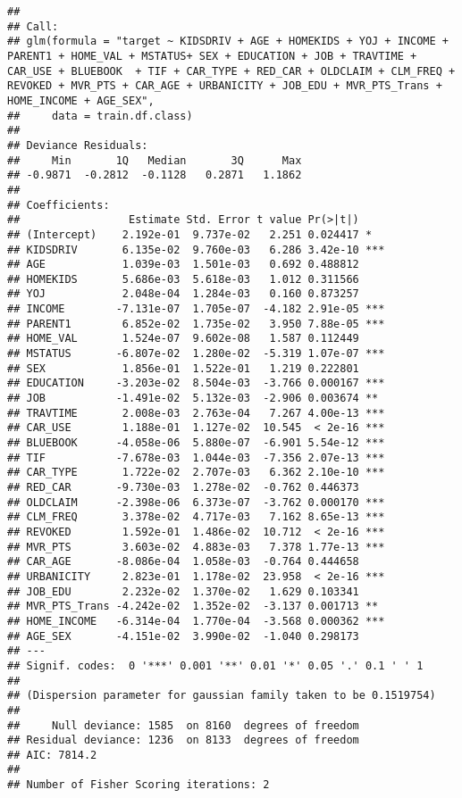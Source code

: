 \documentclass[]{article}
\begin{document}
\begin{verbatim}
## 
## Call:
## glm(formula = "target ~ KIDSDRIV + AGE + HOMEKIDS + YOJ + INCOME + PARENT1 + HOME_VAL + MSTATUS+ SEX + EDUCATION + JOB + TRAVTIME + CAR_USE + BLUEBOOK  + TIF + CAR_TYPE + RED_CAR + OLDCLAIM + CLM_FREQ + REVOKED + MVR_PTS + CAR_AGE + URBANICITY + JOB_EDU + MVR_PTS_Trans + HOME_INCOME + AGE_SEX", 
##     data = train.df.class)
## 
## Deviance Residuals: 
##     Min       1Q   Median       3Q      Max  
## -0.9871  -0.2812  -0.1128   0.2871   1.1862  
## 
## Coefficients:
##                 Estimate Std. Error t value Pr(>|t|)    
## (Intercept)    2.192e-01  9.737e-02   2.251 0.024417 *  
## KIDSDRIV       6.135e-02  9.760e-03   6.286 3.42e-10 ***
## AGE            1.039e-03  1.501e-03   0.692 0.488812    
## HOMEKIDS       5.686e-03  5.618e-03   1.012 0.311566    
## YOJ            2.048e-04  1.284e-03   0.160 0.873257    
## INCOME        -7.131e-07  1.705e-07  -4.182 2.91e-05 ***
## PARENT1        6.852e-02  1.735e-02   3.950 7.88e-05 ***
## HOME_VAL       1.524e-07  9.602e-08   1.587 0.112449    
## MSTATUS       -6.807e-02  1.280e-02  -5.319 1.07e-07 ***
## SEX            1.856e-01  1.522e-01   1.219 0.222801    
## EDUCATION     -3.203e-02  8.504e-03  -3.766 0.000167 ***
## JOB           -1.491e-02  5.132e-03  -2.906 0.003674 ** 
## TRAVTIME       2.008e-03  2.763e-04   7.267 4.00e-13 ***
## CAR_USE        1.188e-01  1.127e-02  10.545  < 2e-16 ***
## BLUEBOOK      -4.058e-06  5.880e-07  -6.901 5.54e-12 ***
## TIF           -7.678e-03  1.044e-03  -7.356 2.07e-13 ***
## CAR_TYPE       1.722e-02  2.707e-03   6.362 2.10e-10 ***
## RED_CAR       -9.730e-03  1.278e-02  -0.762 0.446373    
## OLDCLAIM      -2.398e-06  6.373e-07  -3.762 0.000170 ***
## CLM_FREQ       3.378e-02  4.717e-03   7.162 8.65e-13 ***
## REVOKED        1.592e-01  1.486e-02  10.712  < 2e-16 ***
## MVR_PTS        3.603e-02  4.883e-03   7.378 1.77e-13 ***
## CAR_AGE       -8.086e-04  1.058e-03  -0.764 0.444658    
## URBANICITY     2.823e-01  1.178e-02  23.958  < 2e-16 ***
## JOB_EDU        2.232e-02  1.370e-02   1.629 0.103341    
## MVR_PTS_Trans -4.242e-02  1.352e-02  -3.137 0.001713 ** 
## HOME_INCOME   -6.314e-04  1.770e-04  -3.568 0.000362 ***
## AGE_SEX       -4.151e-02  3.990e-02  -1.040 0.298173    
## ---
## Signif. codes:  0 '***' 0.001 '**' 0.01 '*' 0.05 '.' 0.1 ' ' 1
## 
## (Dispersion parameter for gaussian family taken to be 0.1519754)
## 
##     Null deviance: 1585  on 8160  degrees of freedom
## Residual deviance: 1236  on 8133  degrees of freedom
## AIC: 7814.2
## 
## Number of Fisher Scoring iterations: 2
\end{verbatim}
\end{document}
